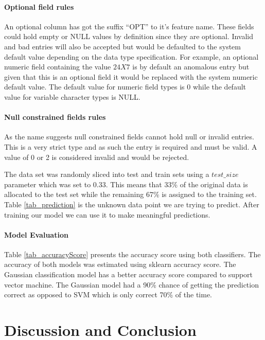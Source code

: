 \documentclass[12pt, letterpaper, titlepage]{report}
\begin{document}
\subsubsection*{Optional field rules}
An optional column has got the suffix “OPT” to it’s feature name. These fields could hold empty or NULL values by definition since they are optional. Invalid and bad entries will also be accepted but would be defaulted to the system default value depending on the data type specification. For example, an optional numeric field containing the value $24X7$ is by default an anomalous entry but given that this is an optional field it would be replaced with the system numeric default value. The default value for numeric field types is 0 while the default value for variable character types is NULL.

\subsubsection*{Null constrained fields rules}
As the name suggests null constrained fields cannot hold null or invalid entries. This is a very strict type and as such the entry is required and must be valid. A value of 0 or 2 is considered invalid and would be rejected.

The data set was randomly sliced into test and train sets using a $test\_size$ parameter which was set to $0.33$. This means that 33\% of the original data is allocated to the test set while the remaining 67\% is assigned to the training set. Table \ref{tab_prediction} is the unknown data point we are trying to predict. After training our model we can use it to make meaningful predictions.

\subsubsection{Model Evaluation}
Table \ref{tab_accuracyScore} presents the accuracy score using both classifiers. The accuracy of both models was estimated using sklearn accuracy score. The Gaussian classification model has a better accuracy score compared to support vector machine. The Gaussian model had a 90\% chance of getting the prediction correct as opposed to SVM which is only correct 70\% of the time.





\chapter{Discussion and Conclusion}
\end{document}
